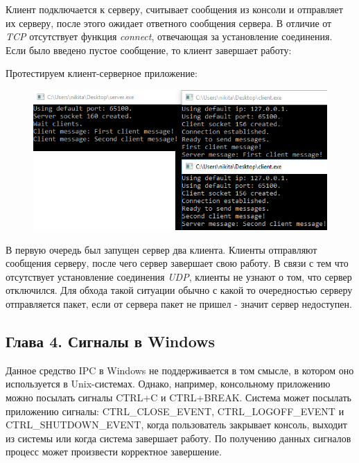 \documentclass[14pt,a4paper,report]{report}
\begin{document}


Клиент подключается к серверу, считывает сообщения из консоли и отправляет их серверу, после этого ожидает ответного сообщения сервера. В отличие от \emph{TCP} отсутствует функция \emph{connect}, отвечающая за установление соединения. Если было введено пустое сообщение, то клиент завершает работу:



\clearpage

Протестируем клиент-серверное приложение:

\begin{figure}[h!]
	\centering
	\includegraphics[scale = 0.9]{images/p3_7.png}
	
	\caption{}
	\label{image:23}
\end{figure}

В первую очередь был запущен сервер два клиента. Клиенты отправляют сообщения серверу, после чего сервер завершает свою работу. В связи с тем что отсутствует установление соединения \emph{UDP}, клиенты не узнают о том, что сервер отключился. Для обхода такой ситуации обычно с какой то очередностью серверу отправляется пакет, если от сервера пакет не пришел - значит сервер недоступен.

\subsection{Глава 4. Сигналы в Windows}

Данное средство IPC в Windows не поддерживается в том смысле, в котором оно используется в Unix-системах. Однако, например, консольному приложению можно посылать сигналы CTRL+C и CTRL+BREAK. Система может посылать приложению сигналы: CTRL\_CLOSE\_EVENT, CTRL\_LOGOFF\_EVENT и CTRL\_SHUTDOWN\_EVENT, когда пользователь закрывает консоль, выходит из системы или когда система завершает работу. По получению данных сигналов процесс может произвести корректное завершение.
\end{document}
